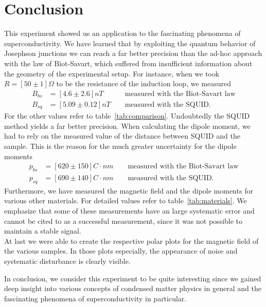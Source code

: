 \FloatBarrier
\clearpage
\section{Conclusion}
This experiment showed us an application to the fascinating phenomena
of superconductivity. We have learned that by exploiting 
the quantum behavior of Josephson junctions we can reach a far better
precision than the ad-hoc approach with the law of Biot-Savart, which suffered
from insufficient information about the geometry of the experimental setup.
For instance, when we took $R=[50\pm1] \Omega$ to be the resistance of the induction loop,
we measured
\begin{align*}
B_{bs} &= [4.6\pm 2.6] nT   \qquad \quad \text{measured with the Biot-Savart law} \\ 
B_{sq} &= [5.09\pm0.12] nT \qquad \text{measured with the SQUID}.
\end{align*}
For the other values refer to table~\ref{tab:comparison}.
Undoubtedly the SQUID method yields a far better precision.
When calculating the dipole moment, we had to rely on the measured
value of the distance between SQUID and the sample. This is the reason
for the much greater uncertainty for the dipole moments
\begin{align*}
p_{bs} &= [620\pm150] C\cdot nm  \qquad \text{measured with the Biot-Savart law} \\ 
p_{sq} &= [690\pm140] C\cdot nm  \qquad \text{measured with the SQUID}.
\end{align*}
Furthermore, we have measured the magnetic field and the dipole moments for
various other materials. 
For detailed values refer to 
table~\ref{tab:materials}. 
We emphasize that some of these measurements have an large systematic 
error and cannot be cited to as a successful measurement, 
since it was not possible to maintain a stable signal. \\
At last we were able to create the respective polar plots for the 
magnetic field of the various samples. In those plots especially, the
appearance of noise and systematic disturbance is clearly visible. 

In conclusion, we consider this experiment to be quite interesting since we gained deep 
insight into various concepts of condensed matter physics in general and the
fascinating phenomena of superconductivity in particular.
